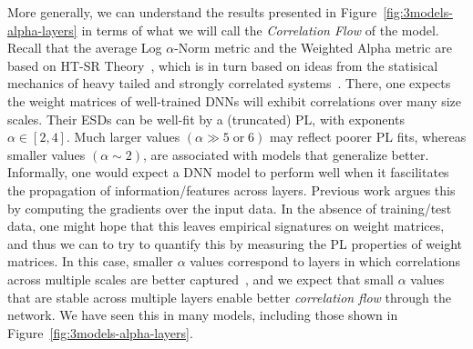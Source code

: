 More generally, we can understand the results presented in Figure~\ref{fig:3models-alpha-layers} in terms of what we will call the \emph{Correlation Flow} of the model. 
Recall that the average Log $\alpha$-Norm metric and the Weighted Alpha metric are based on HT-SR Theory~\cite{MM18_TR, MM19_HTSR_ICML, MM20_SDM}, which is in turn based on ideas from the statisical mechanics of heavy tailed and strongly correlated systems~\cite{BouchaudPotters03, SornetteBook, BP11, bun2017}. 
There, one expects the weight matrices of well-trained DNNs will exhibit correlations over many size scales. 
Their ESDs can be well-fit by a (truncated) PL, with exponents $\alpha\in[2,4]$.
Much larger values $(\alpha\gg 5\;\mbox{or}\;6)$ may reflect poorer PL fits, whereas smaller values $(\alpha\sim 2)$, are associated with models that generalize better.
Informally, one would expect a DNN model to perform well when it fascilitates the propagation of information/features across layers.
Previous work argues this by computing the gradients over the input data.
In the absence of training/test data, one might hope that this leaves empirical signatures on weight matrices, and thus we can to try to quantify this by measuring the PL properties of weight matrices.
In this case, smaller $\alpha$ values correspond to layers in which correlations across multiple scales are better captured~\cite{MM18_TR,SornetteBook}, and we expect that small $\alpha$ values that are stable across multiple layers enable better \emph{correlation flow} through the network.
We have seen this in many models, including those shown in Figure~\ref{fig:3models-alpha-layers}.


